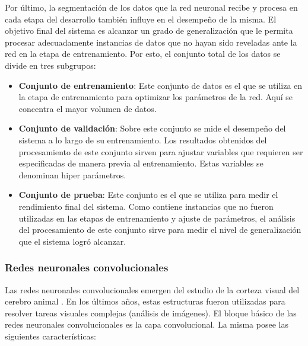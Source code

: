 Por último, la segmentación de los datos que la red neuronal recibe y procesa en cada etapa del desarrollo también influye en el desempeño de la misma. El objetivo final del sistema es alcanzar un grado de generalización que le permita procesar adecuadamente instancias de datos que no hayan sido reveladas ante la red en la etapa de entrenamiento. Por esto, el conjunto total de los datos se divide en tres subgrupos: 

\begin{itemize}
\item\textbf{Conjunto de entrenamiento}: Este conjunto de datos es el que se utiliza en la etapa de entrenamiento para optimizar los parámetros de la red. Aquí se concentra el mayor volumen de datos.

\item\textbf{Conjunto de validación}: Sobre este conjunto se mide el desempeño del sistema a lo largo de su entrenamiento. Los resultados obtenidos del procesamiento de este conjunto sirven para ajustar variables que requieren ser especificadas de manera previa al entrenamiento. Estas variables se denominan hiper parámetros.
 
\item\textbf{Conjunto de prueba}: Este conjunto es el que se utiliza para medir el rendimiento final del sistema. Como contiene instancias que no fueron utilizadas en las etapas de entrenamiento y ajuste de parámetros, el análisis del procesamiento de este conjunto sirve para medir el nivel de generalización que el sistema logró alcanzar. 

\end{itemize}


 

\subsubsection{Redes neuronales convolucionales}

Las redes neuronales convolucionales emergen del estudio de la corteza visual del cerebro animal \cite{animales}. En los últimos años, estas estructuras fueron utilizadas para resolver tareas visuales complejas (análisis de imágenes). 
El bloque básico de las redes neuronales convolucionales es la capa convolucional. La misma posee las siguientes características:

